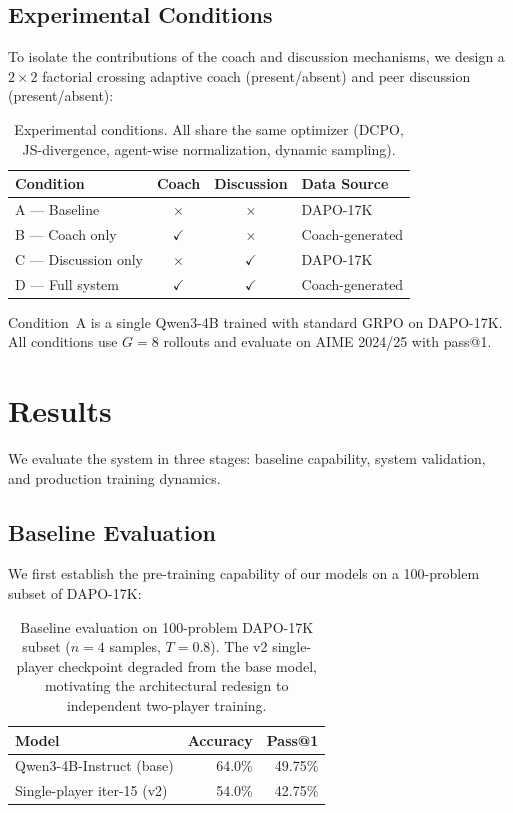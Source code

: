 \documentclass{article}
\begin{document}
\subsection{Experimental Conditions}
\label{sec:conditions}

To isolate the contributions of the coach and discussion mechanisms, we design a $2\times 2$ factorial crossing adaptive coach (present/absent) and peer discussion (present/absent):

\begin{table}[h]
\centering
\begin{tabular}{lccl}
\toprule
\textbf{Condition} & \textbf{Coach} & \textbf{Discussion} & \textbf{Data Source} \\
\midrule
A --- Baseline & $\times$ & $\times$ & DAPO-17K \\
B --- Coach only & $\checkmark$ & $\times$ & Coach-generated \\
C --- Discussion only & $\times$ & $\checkmark$ & DAPO-17K \\
D --- Full system & $\checkmark$ & $\checkmark$ & Coach-generated \\
\bottomrule
\end{tabular}
\caption{Experimental conditions. All share the same optimizer (DCPO, JS-divergence, agent-wise normalization, dynamic sampling).}
\label{tab:conditions}
\end{table}

Condition~A is a single Qwen3-4B trained with standard GRPO on DAPO-17K. All conditions use $G\!=\!8$ rollouts and evaluate on AIME 2024/25 with pass@1.


\section{Results}
\label{sec:results}

We evaluate the system in three stages: baseline capability, system validation, and production training dynamics.

\subsection{Baseline Evaluation}

We first establish the pre-training capability of our models on a 100-problem subset of DAPO-17K:

\begin{table}[h]
\centering
\begin{tabular}{lrr}
\toprule
\textbf{Model} & \textbf{Accuracy} & \textbf{Pass@1} \\
\midrule
Qwen3-4B-Instruct (base) & 64.0\% & 49.75\% \\
Single-player iter-15 (v2) & 54.0\% & 42.75\% \\
\bottomrule
\end{tabular}
\caption{Baseline evaluation on 100-problem DAPO-17K subset ($n\!=\!4$ samples, $T\!=\!0.8$). The v2 single-player checkpoint degraded from the base model, motivating the architectural redesign to independent two-player training.}
\label{tab:baseline}
\end{table}
\end{document}
